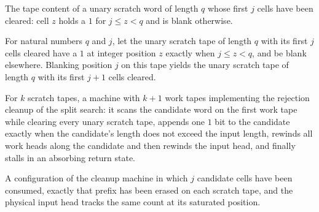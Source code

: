 \begin{definition}
\label{Turing.FinTM.splitScratch}
\leanok
The tape content of a unary scratch word of length $q$ whose first $j$ cells
have been cleared: cell $z$ holds a $1$ for $j \le z < q$ and is blank
otherwise.
\end{definition}

\begin{lemma}
\label{Turing.FinTM.splitScratch_erase}
\leanok
{}
For natural numbers $q$ and $j$, let the unary scratch tape of length $q$ with its first
$j$ cells cleared have a $1$ at integer position $z$ exactly when $j\le z<q$, and be
blank elsewhere. Blanking position $j$ on this tape yields the unary scratch tape of
length $q$ with its first $j+1$ cells cleared.
\end{lemma}

\begin{definition}
\label{Turing.FinTM.splitRestoreTM}
\leanok
{}
For $k$ scratch tapes, a machine with $k+1$ work tapes implementing the
rejection cleanup of the split search: it scans the candidate word on the
first work tape while clearing every unary scratch tape, appends one $1$ bit
to the candidate exactly when the candidate's length does not exceed the
input length, rewinds all work heads along the candidate and then rewinds the
input head, and finally stalls in an absorbing return state.
\end{definition}

\begin{definition}
\label{Turing.FinTM.splitRestoreScan}
\leanok
{}
A configuration of the cleanup machine in which $j$ candidate cells have been
consumed, exactly that prefix has been erased on each scratch tape, and the
physical input head tracks the same count at its saturated position.
\end{definition}

